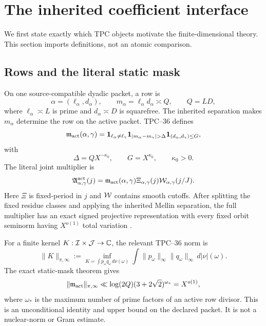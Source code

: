 \section{The inherited coefficient interface}
\label{sec:tpc49-interface}

We first state exactly which TPC objects motivate the finite-dimensional
theory.  This section imports definitions, not an atomic comparison.

\subsection{Rows and the literal static mask}

On one source-compatible dyadic packet, a row is
\begin{equation}
 \alpha=(\ell_\alpha,d_\alpha),
 \qquad m_\alpha=\ell_\alpha d_\alpha\asymp Q,
 \qquad Q=LD,
 \label{eq:tpc49-row-definition}
\end{equation}
where \(\ell_\alpha\asymp L\) is prime and
\(d_\alpha\asymp D\) is squarefree.  The inherited separation makes
\(m_\alpha\) determine the row on the active packet.  TPC--36 defines
\begin{equation}
 \mathfrak m_{\rm act}(\alpha,\gamma)
 =\one_{\ell_\alpha\ne\ell_\gamma}
  \one_{|m_\alpha-m_\gamma|>\Delta}
  \one_{(d_\alpha,d_\gamma)\le G},
 \label{eq:tpc49-actual-static-mask}
\end{equation}
with
\begin{equation}
 \Delta=QX^{-\kappa_0},
 \qquad G=X^{\kappa_0},
 \qquad \kappa_0>0.
 \label{eq:tpc49-pruning-scales}
\end{equation}
The literal joint multiplier is
\begin{equation}
 \mathfrak A_{\alpha,\gamma}^{\rm act}(j)
 =\mathfrak m_{\rm act}(\alpha,\gamma)
  \Xi_{\alpha,\gamma}(j)
  \mathcal W_{\alpha,\gamma}(j/J).
 \label{eq:tpc49-joint-multiplier}
\end{equation}
Here \(\Xi\) is fixed-period in \(j\) and \(\mathcal W\) contains smooth
cutoffs.  After splitting the fixed residue classes and applying the
inherited Mellin separation, the full multiplier has an exact signed
projective representation with every fixed orbit seminorm having
\(X^{o(1)}\) total variation \citep{WangTPC36}.

For a finite kernel \(K:\mathcal I\times\mathcal J\to\mathbb C\), the relevant TPC--36
norm is
\begin{equation}
 \|K\|_{\pi,\infty}
 :=\inf_{K=\int p_\omega q_\omega\,d\nu(\omega)}
 \int \|p_\omega\|_\infty
       \|q_\omega\|_\infty\,d|\nu|(\omega).
 \label{eq:tpc49-bounded-projective-norm}
\end{equation}
The exact static-mask theorem gives
\begin{equation}
 \|\mathfrak m_{\rm act}\|_{\pi,\infty}
 \ll \log(2Q)(3+2\sqrt2)^{\omega_*}
 =X^{o(1)},
 \label{eq:tpc49-inherited-mask-cost}
\end{equation}
where \(\omega_*\) is the maximum number of prime factors of an active
row divisor.  This is an unconditional identity and upper bound on the
declared packet.  It is not a nuclear-norm or Gram estimate.

